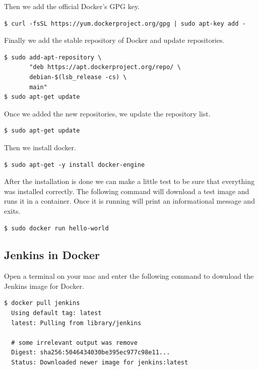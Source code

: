 Then we add the official Docker's GPG key.

\begin{verbatim}
$ curl -fsSL https://yum.dockerproject.org/gpg | sudo apt-key add -
\end{verbatim}

Finally we add the stable repository of Docker and update repositories.

\begin{verbatim}
$ sudo add-apt-repository \
       "deb https://apt.dockerproject.org/repo/ \
       debian-$(lsb_release -cs) \
       main"
$ sudo apt-get update
\end{verbatim}

Once we added the new repositories, we update the repository list.

\begin{verbatim}
$ sudo apt-get update
\end{verbatim}

Then we install docker.

\begin{verbatim}
$ sudo apt-get -y install docker-engine
\end{verbatim}

After the installation is done we can make a little test to be sure that everything was installed correctly. The following command will download a test image and runs it in a container. Once it is running will print an informational message and exits.

\begin{verbatim}
$ sudo docker run hello-world
\end{verbatim}

\subsection{Jenkins in Docker}
Open a terminal on your mac and enter the following command to download the Jenkins image for Docker.

\begin{verbatim}
$ docker pull jenkins
  Using default tag: latest
  latest: Pulling from library/jenkins

  # some irrelevant output was remove
  Digest: sha256:5046434030be395ec977c98e11...
  Status: Downloaded newer image for jenkins:latest
\end{verbatim}

